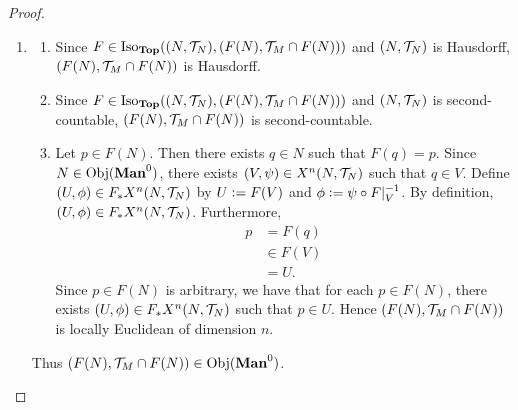 \documentclass{book}
\begin{document}
\begin{proof}
\begin{enumerate}
\begin{itemize}
\begin{itemize}
\begin{align*}
					& = \psi(V) \\
					& \in \MT_{\R^n}.
				\end{align*}
				\item Since $\psi \in \Iso_{\bTop}((V, \MT_N \cap V), (\psi(V), \MT_{\R^n} \cap \psi(V))$, and $F|_V^{-1} \in \Iso_{\bTop}((F(V), \MT_M \cap F(V)), (V, \MT_N \cap V))$, we have that $\psi \circ F|V^{-1} \in \Iso_{\bTop}((F(V), \MT_M \cap F(V)), (\psi(V), \MT_{\R^n} \cap \psi(V))$. 
			\end{itemize}
			Hence $(U, \phi) \in X^n(F(N), \MT_M \cap F(N))$.
			\item Similarly, if there exists $j \in [n]$ such that $(V, \psi)$ is an $\H^n_j$-coordinate chart on $(N, \MT_N)$, then $(U, \phi) \in X^n(F(N), \MT_M \cap F(N))$.
		\end{itemize}
		Since $(U, \phi) \in F_*X^n(N, \MT_N)$ is arbitrary, we have that $F_*X^n(N, \MT_N) \subset X^n(F(N), \MT_M \cap F(N))$.
		\item 
		\begin{enumerate}
			\item Since $F \in \operatorname{Iso}_{\operatorname*{\text{\textbf{Top}}}}((N, \mathcal{T}_N), (F(N), \mathcal{T}_M \cap F(N)))$ and $(N, \MT_N)$ is Hausdorff, $(F(N), \mathcal{T}_M \cap F(N))$ is Hausdorff.
			\item Since $F \in \operatorname{Iso}_{\operatorname*{\text{\textbf{Top}}}}((N, \mathcal{T}_N), (F(N), \mathcal{T}_M \cap F(N)))$ and $(N, \MT_N)$ is second-countable, $(F(N), \mathcal{T}_M \cap F(N))$ is second-countable.
			\item Let $p \in F(N)$. Then there exists $q \in N$ such that $F(q) = p$. Since $N \in \operatorname{Obj}(\operatorname*{\text{\textbf{Man}}^0})$, there exists $(V, \psi) \in X^n(N, \mathcal{T}_N)$ such that $q \in V$. Define $(U, \phi) \in F_*X^n(N, \MT_N)$ by $U \vcentcolon= F(V)$ and $\phi \vcentcolon= \psi \circ F|_V^{-1}$. By definition, $(U, \phi) \in F_*X^n(N, \MT_N)$. Furthermore,  
			\begin{align*}
				p
				& = F(q) \\
				& \in F(V) \\
				& = U.
			\end{align*}
			Since $p \in F(N)$ is arbitrary, we have that for each $p \in F(N)$, there exists $(U, \phi) \in F_*X^n(N, \MT_N)$ such that $p \in U$. Hence $(F(N), \mathcal{T}_M \cap F(N))$ is locally Euclidean of dimension $n$. 
		\end{enumerate}
		Thus $(F(N), \mathcal{T}_M \cap F(N)) \in \operatorname{Obj}(\operatorname*{\text{\textbf{Man}}^0})$. 
	\end{enumerate}
\end{proof}
\end{document}
